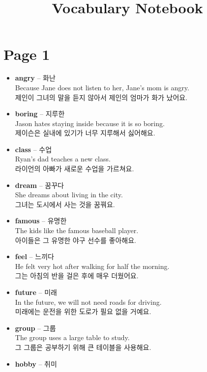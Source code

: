 \documentclass[12pt]{article}
\begin{document}
\title{Vocabulary Notebook}
\author{}
\date{}
\maketitle

\section*{Page 1}
\begin{itemize}
    \item \textbf{angry} -- 화난 \\
    Because Jane does not listen to her, Jane's mom is angry. \\
    제인이 그녀의 말을 듣지 않아서 제인의 엄마가 화가 났어요.
    \item \textbf{boring} -- 지루한 \\
    Jason hates staying inside because it is so boring. \\
    제이슨은 실내에 있기가 너무 지루해서 싫어해요.
    \item \textbf{class} -- 수업 \\
    Ryan's dad teaches a new class. \\
    라이언의 아빠가 새로운 수업을 가르쳐요.
    \item \textbf{dream} -- 꿈꾸다 \\
    She dreams about living in the city. \\
    그녀는 도시에서 사는 것을 꿈꿔요.
    \item \textbf{famous} -- 유명한 \\
    The kids like the famous baseball player. \\
    아이들은 그 유명한 야구 선수를 좋아해요.
    \item \textbf{feel} -- 느끼다 \\
    He felt very hot after walking for half the morning. \\
    그는 아침의 반을 걸은 후에 매우 더웠어요.
    \item \textbf{future} -- 미래 \\
    In the future, we will not need roads for driving. \\
    미래에는 운전을 위한 도로가 필요 없을 거예요.
    \item \textbf{group} -- 그룹 \\
    The group uses a large table to study. \\
    그 그룹은 공부하기 위해 큰 테이블을 사용해요.
    \item \textbf{hobby} -- 취미 \\

\end{itemize}
\end{document}
